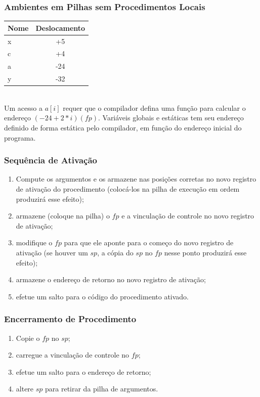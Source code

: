 \documentclass[table]{beamer}
\begin{document}
\begin{frame}
   \frametitle{Ambientes em Pilhas sem Procedimentos Locais}
   \begin{table}
   \begin{tabular}{l|c}
   Nome & Deslocamento \\
   \hline
   x & +5 \\
   c & +4 \\
   a & -24 \\
   y & -32 \\
   \hline 
   \end{tabular}
   \\
   \vspace{1.0cm}
   Um acesso a $a[i]$ requer que o compilador defina uma função para calcular o endereço $(-24 + 2 * i) (fp)$. Variáveis globais e estáticas tem seu endereço definido de forma estática pelo compilador, em função do endereço inicial do programa.
\end{table}
\end{frame}

\begin{frame}
   \frametitle{Sequência de Ativação}
   \begin{enumerate}
      \item Compute os argumentos e os armazene nas posições corretas no novo registro de ativação do procedimento (colocá-los na pilha de execução em ordem produzirá esse efeito);
      \item armazene (coloque na pilha) o $fp$ e a vinculação de controle no novo registro de ativação;
      \item modifique o $fp$ para que ele aponte para o começo do novo registro de ativação (se houver um $sp$, a cópia do $sp$ no $fp$ nesse ponto produzirá esse efeito);
      \item armazene o endereço de retorno no novo registro de ativação;
      \item efetue um salto para o código do procedimento ativado.
   \end{enumerate}
\end{frame}

\begin{frame}
   \frametitle{Encerramento de Procedimento}
   \begin{enumerate}
      \item Copie o $fp$ no $sp$;
      \item carregue a vinculação de controle no $fp$;
      \item efetue um salto para o endereço de retorno;
      \item altere $sp$ para retirar da pilha de argumentos.
   \end{enumerate}
\end{frame}
\end{document}
